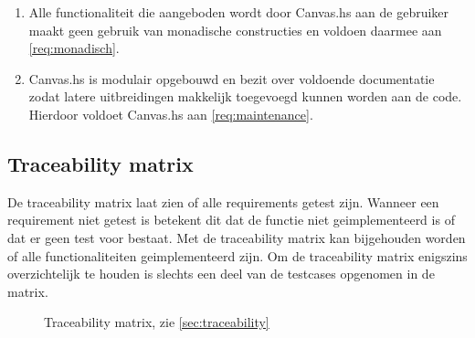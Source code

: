 \begin{enumerate}[label={T\arabic*}]
	\setcounter{enumi}{\value{startvaluetest}}
	\item \label{test:opzet:monadisch} Alle functionaliteit die aangeboden wordt door Canvas.hs aan de gebruiker maakt geen gebruik van monadische constructies en voldoen daarmee aan \ref{req:monadisch}.
	\item \label{test:opzet:modulair} Canvas.hs is modulair opgebouwd en bezit over voldoende documentatie zodat latere uitbreidingen makkelijk toegevoegd kunnen worden aan de code. Hierdoor voldoet Canvas.hs aan \ref{req:maintenance}.
\end{enumerate}

\subsection{Traceability matrix} \label{sec:traceability}
De traceability matrix laat zien of alle requirements getest zijn. Wanneer een requirement niet getest is betekent dit dat de functie niet geimplementeerd is of dat er geen test voor bestaat. Met de traceability matrix kan bijgehouden worden of alle functionaliteiten geimplementeerd zijn. Om de traceability matrix enigszins overzichtelijk te houden is slechts een deel van de testcases opgenomen in de matrix.

\begin{figure}
\begin{center}
\resizebox{\linewidth}{!}{}
\caption{Traceability matrix, zie \autoref{sec:traceability}}
\label{fig:traceability}
\end{center}
\end{figure}






